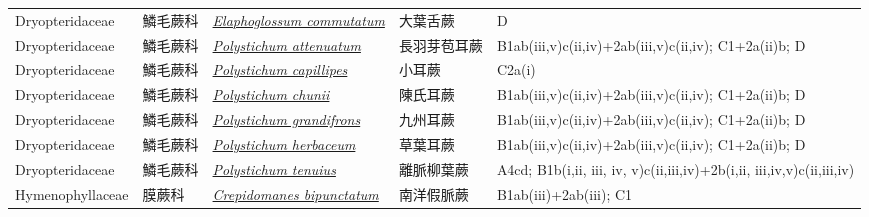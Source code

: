 {\begin{longtable}{L{2.5cm}L{2cm}L{5cm}L{2.5cm}L{3cm}}
    Dryopteridaceae & 鱗毛蕨科 & \href{http://www.theplantlist.org/tpl1.1/search?q=Elaphoglossum+commutatum}{\textit{Elaphoglossum commutatum} } & 大葉舌蕨 & D    \\
    Dryopteridaceae & 鱗毛蕨科 & \href{http://www.theplantlist.org/tpl1.1/search?q=Polystichum+attenuatum}{\textit{Polystichum attenuatum} } & 長羽芽苞耳蕨 & B1ab(iii,v)c(ii,iv)+2ab(iii,v)c(ii,iv); C1+2a(ii)b; D    \\
    Dryopteridaceae & 鱗毛蕨科 & \href{http://www.theplantlist.org/tpl1.1/search?q=Polystichum+capillipes}{\textit{Polystichum capillipes} } & 小耳蕨 & C2a(i)    \\
    Dryopteridaceae & 鱗毛蕨科 & \href{http://www.theplantlist.org/tpl1.1/search?q=Polystichum+chunii}{\textit{Polystichum chunii} } & 陳氏耳蕨 & B1ab(iii,v)c(ii,iv)+2ab(iii,v)c(ii,iv); C1+2a(ii)b; D    \\
    Dryopteridaceae & 鱗毛蕨科 & \href{http://www.theplantlist.org/tpl1.1/search?q=Polystichum+grandifrons}{\textit{Polystichum grandifrons} } & 九州耳蕨 & B1ab(iii,v)c(ii,iv)+2ab(iii,v)c(ii,iv); C1+2a(ii)b; D    \\
    Dryopteridaceae & 鱗毛蕨科 & \href{http://www.theplantlist.org/tpl1.1/search?q=Polystichum+herbaceum}{\textit{Polystichum herbaceum} } & 草葉耳蕨 & B1ab(iii,v)c(ii,iv)+2ab(iii,v)c(ii,iv); C1+2a(ii)b; D    \\
    Dryopteridaceae & 鱗毛蕨科 & \href{http://www.theplantlist.org/tpl1.1/search?q=Polystichum+tenuius}{\textit{Polystichum tenuius} } & 離脈柳葉蕨 & A4cd; B1b(i,ii, iii, iv, v)c(ii,iii,iv)+2b(i,ii, iii,iv,v)c(ii,iii,iv)    \\
    Hymenophyllaceae & 膜蕨科 & \href{http://www.theplantlist.org/tpl1.1/search?q=Crepidomanes+bipunctatum}{\textit{Crepidomanes bipunctatum} } & 南洋假脈蕨 & B1ab(iii)+2ab(iii); C1    \\

\end{longtable}}
